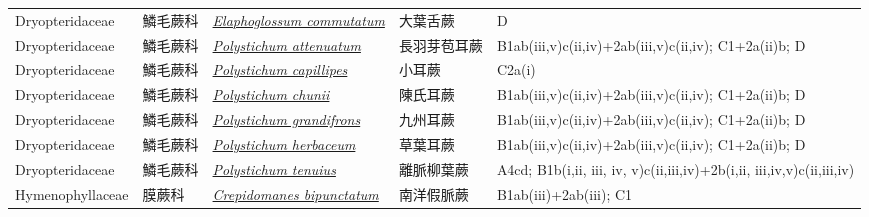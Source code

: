 {\begin{longtable}{L{2.5cm}L{2cm}L{5cm}L{2.5cm}L{3cm}}
    Dryopteridaceae & 鱗毛蕨科 & \href{http://www.theplantlist.org/tpl1.1/search?q=Elaphoglossum+commutatum}{\textit{Elaphoglossum commutatum} } & 大葉舌蕨 & D    \\
    Dryopteridaceae & 鱗毛蕨科 & \href{http://www.theplantlist.org/tpl1.1/search?q=Polystichum+attenuatum}{\textit{Polystichum attenuatum} } & 長羽芽苞耳蕨 & B1ab(iii,v)c(ii,iv)+2ab(iii,v)c(ii,iv); C1+2a(ii)b; D    \\
    Dryopteridaceae & 鱗毛蕨科 & \href{http://www.theplantlist.org/tpl1.1/search?q=Polystichum+capillipes}{\textit{Polystichum capillipes} } & 小耳蕨 & C2a(i)    \\
    Dryopteridaceae & 鱗毛蕨科 & \href{http://www.theplantlist.org/tpl1.1/search?q=Polystichum+chunii}{\textit{Polystichum chunii} } & 陳氏耳蕨 & B1ab(iii,v)c(ii,iv)+2ab(iii,v)c(ii,iv); C1+2a(ii)b; D    \\
    Dryopteridaceae & 鱗毛蕨科 & \href{http://www.theplantlist.org/tpl1.1/search?q=Polystichum+grandifrons}{\textit{Polystichum grandifrons} } & 九州耳蕨 & B1ab(iii,v)c(ii,iv)+2ab(iii,v)c(ii,iv); C1+2a(ii)b; D    \\
    Dryopteridaceae & 鱗毛蕨科 & \href{http://www.theplantlist.org/tpl1.1/search?q=Polystichum+herbaceum}{\textit{Polystichum herbaceum} } & 草葉耳蕨 & B1ab(iii,v)c(ii,iv)+2ab(iii,v)c(ii,iv); C1+2a(ii)b; D    \\
    Dryopteridaceae & 鱗毛蕨科 & \href{http://www.theplantlist.org/tpl1.1/search?q=Polystichum+tenuius}{\textit{Polystichum tenuius} } & 離脈柳葉蕨 & A4cd; B1b(i,ii, iii, iv, v)c(ii,iii,iv)+2b(i,ii, iii,iv,v)c(ii,iii,iv)    \\
    Hymenophyllaceae & 膜蕨科 & \href{http://www.theplantlist.org/tpl1.1/search?q=Crepidomanes+bipunctatum}{\textit{Crepidomanes bipunctatum} } & 南洋假脈蕨 & B1ab(iii)+2ab(iii); C1    \\

\end{longtable}}
